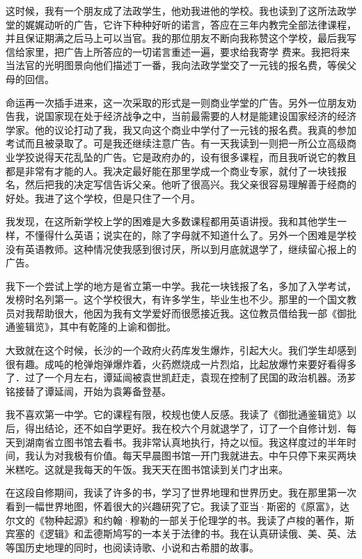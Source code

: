 \documentclass[10pt]{book}
\begin{document}
这时候，我有一个朋友成了法政学生，他劝我进他的学校。我也读到了这所法政学堂的娓娓动听的广告，它许下种种好听的诺言，答应在三年内教完全部法律课程，并且保证期满之后马上可以当官。我的那位朋友不断向我称赞这个学校，最后我写信给家里，把广告上所答应的一切诺言重述一遍，要求给我寄学 费来。我把将来当法官的光明图景向他们描述丁一番，我向法政学堂交了一元钱的报名费，等侯父母的回信。

命运再一次插手进来，这一次采取的形式是一则商业学堂的广告。另外一位朋友劝告我，说国家现在处于经济战争之中，当前最需要的人材是能建设国家经济的经济学家。他的议论打动了我，我又向这个商业中学付了一元钱的报名费。我真的参加考试而且被录取了。可是我还继续注意广告。有一天我读到一则把一所公立高级商业学狡说得天花乱坠的广告。它是政府办的，设有很多课程，而且我听说它的教且都是非常有才能的人。我决定最好能在那里学成一个商业专家，就付了一块钱报名，然后把我的决定写信告诉父亲。他听了很高兴。我父亲很容易理解善于经商的好处。我进了这个学校，但是只住了一个月。

我发现，在这所新学校上学的困难是大多数课程都用英语讲授。我和其他学生一样，不懂得什么英语；说实在的，除了字母就不知道什么了。另外一个困难是学校没有英语教师。这种情况使我感到很讨厌，所以到月底就退学了，继续留心报上的广告。

我下一个尝试上学的地方是省立第一中学。我花一块钱报了名，多加了入学考试，发榜时名列第一。这个学校很大，有许多学生，毕业生也不少。那里的一个国文教员对我帮助很大，他因为我有文学爱好而很愿接近我。这位教员借给我一部《御批通鉴辑览》，其中有乾隆的上谕和御批。

大致就在这个时候，长沙的一个政府火药库发生爆炸，引起大火。我们学生却感到很有趣。成吨的枪弹炮弹爆炸着，火药燃烧成一片烈焰，比起放爆竹来要好看得多了．过了一个月左右，谭延闿被袁世凯赶走，袁现在控制了民国的政治机器。汤芗铭接替了谭延闿，开始为袁筹备登基。

我不喜欢第一中学。它的课程有限，校规也使人反感。我读了《御批通鉴辑览》以后，得出结论，还不如自学更好。我在校六个月就退学了，订了一个自修计划．每天到湖南省立图书馆去看书。我非常认真地执行，持之以恒。我这样度过的半年时间，我认为对我极有价值。每天早晨图书馆一开门我就进去。中午只停下来买两块米糕吃。这就是我每天的午饭。我天天在图书馆读到关门才出来。

在这段自修期间，我读了许多的书，学习了世界地理和世界历史。我在那里第一次看到一幅世界地图，怀着很大的兴趣研究了它。我读了亚当·斯密的《原富》，达尔文的《物种起源》和约翰·穆勒的一部关于伦理学的书。我读了卢梭的著作，斯宾塞的《逻辑》和盂德斯鸠写的一本关于法律的书。我在认真研读俄、美、英、法等国历史地理的同时，也阅读诗歌、小说和古希腊的故事。
\end{document}
